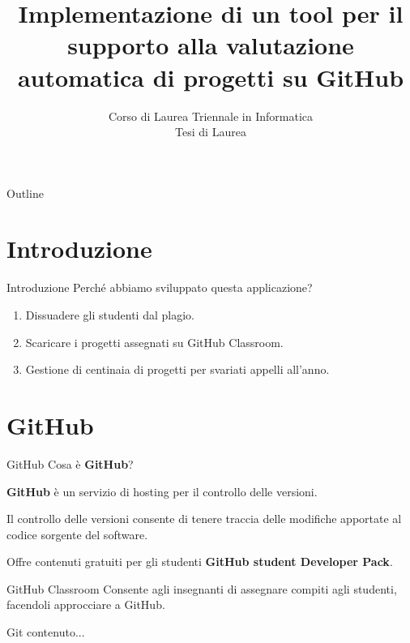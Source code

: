 \documentclass{beamer}
\title{\vspace{-0cm}Implementazione di un tool per il supporto alla valutazione automatica di progetti su GitHub}
\subtitle{\vspace{-0cm}Corso di Laurea Triennale in Informatica\\{\large Tesi di Laurea}}
\author{\vspace{-0.5cm}\centering{\hspace{-2.3cm}\textbf{Laureando}:\hspace{2.7cm}\textbf{Relatore}:\\Matteo Azzarelli\hspace{2cm}Prof. Francesco Santini}}
\date{\vspace{2.5cm}\color{black}{\footnotesize{ANNO ACCADEMICO 2017/2018}}}
\begin{document}
	\maketitle

	\begin{frame}{Outline}
		\tableofcontents
	\end{frame}

	\section{Introduzione}
	
	\begin{frame}{Introduzione}
		Perché abbiamo sviluppato questa applicazione?
		\pause
		\begin{enumerate}[<+->]
			\item Dissuadere gli studenti dal plagio.
			\item Scaricare i progetti assegnati su GitHub Classroom.
			\item Gestione di centinaia di progetti per svariati appelli all'anno.
		\end{enumerate}
	\end{frame}

	\section{GitHub}
	
	\begin{frame}{GitHub}
		Cosa è \textbf{GitHub}?
		
		\vspace{0.5cm}
		\textbf{GitHub} è un servizio di hosting per il controllo delle versioni. 
		
		\vspace{0.5cm}
		Il controllo delle versioni consente di tenere traccia delle modifiche apportate al codice sorgente del software.
		\pause
		
		\begin{block}{}
			Offre contenuti gratuiti per gli studenti \textbf{GitHub student Developer Pack}.
		\end{block}
		\begin{block}{GitHub Classroom}
			Consente agli insegnanti di assegnare compiti agli studenti, facendoli approcciare a GitHub.
		\end{block}
	\end{frame}

	
	\begin{frame}{Git}
		contenuto...
	\end{frame}
	
\end{document}
